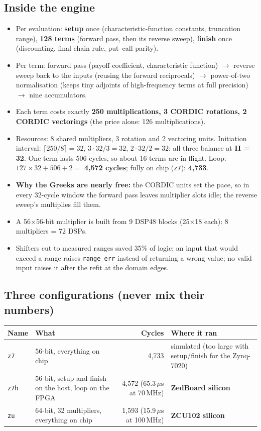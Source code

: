 \documentclass[11pt,a4paper]{article}
\begin{document}
\subsection{Inside the engine}
\begin{itemize}
\item Per evaluation: \textbf{setup} once (characteristic-function constants, truncation
range), \textbf{128 terms} (forward pass, then its reverse sweep), \textbf{finish} once
(discounting, final chain rule, put--call parity).
\item Per term: forward pass (payoff coefficient, characteristic function) $\rightarrow$ reverse
sweep back to the inputs (reusing the forward reciprocals) $\rightarrow$ power-of-two
normalisation (keeps tiny adjoints of high-frequency terms at full precision) $\rightarrow$
nine accumulators.
\item Each term costs exactly \textbf{250 multiplications, 3 CORDIC rotations, 2 CORDIC
vectorings} (the price alone: 126 multiplications).
\item Resources: 8 shared multipliers, 3 rotation and 2 vectoring units. Initiation interval:
$\lceil 250/8\rceil = 32$, $3\cdot 32/3 = 32$, $2\cdot 32/2 = 32$: all three balance at
\textbf{II = 32}. One term lasts 506 cycles, so about 16 terms are in flight. Loop:
$127\times32 + 506 + 2 = $ \textbf{4,572 cycles}; fully on chip (\texttt{z7}): \textbf{4,733}.
\item \textbf{Why the Greeks are nearly free:} the CORDIC units set the pace, so in every
32-cycle window the forward pass leaves multiplier slots idle; the reverse sweep's
multiplies fill them.
\item A 56$\times$56-bit multiplier is built from 9 DSP48 blocks (25$\times$18 each): 8
multipliers = 72 DSPs.
\item Shifters cut to measured ranges saved 35\% of logic; an input that would exceed a range
raises \texttt{range\_err} instead of returning a wrong value; no valid input raises it after
the refit at the domain edges.
\end{itemize}

\subsection{Three configurations (never mix their numbers)}
\begin{center}\small
\begin{tabular}{@{}lL{5.2cm}rL{4.6cm}@{}}
\toprule
\textbf{Name} & \textbf{What} & \textbf{Cycles} & \textbf{Where it ran}\\
\midrule
\texttt{z7} & 56-bit, everything on chip & 4,733 & simulated (too large with setup/finish for the Zynq-7020)\\
\texttt{z7h} & 56-bit, setup and finish on the host, loop on the FPGA & 4,572 (65.3\,$\mu$s at 70\,MHz) & \textbf{ZedBoard silicon}\\
\texttt{zu} & 64-bit, 32 multipliers, everything on chip & 1,593 (15.9\,$\mu$s at 100\,MHz) & \textbf{ZCU102 silicon}\\
\bottomrule
\end{tabular}
\end{center}
\end{document}
